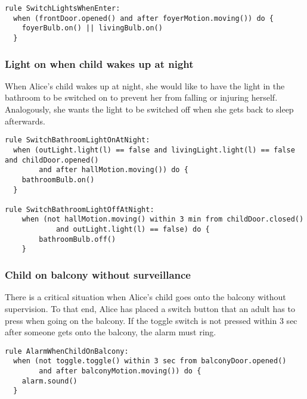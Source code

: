 \begin{lstlisting}[language=iotdsl]
rule SwitchLightsWhenEnter:
  when (frontDoor.opened() and after foyerMotion.moving()) do {
    foyerBulb.on() || livingBulb.on()
  }
\end{lstlisting}


\subsubsection*{Light on when child wakes up at night}
	
When Alice's child wakes up at night, she would like to have the light in the bathroom to be switched on to prevent her from falling or injuring herself. Analogously, she wants the light to be switched off when she gets back to sleep afterwards.
	
\begin{lstlisting}[language=iotdsl]
rule SwitchBathroomLightOnAtNight:	
  when (outLight.light(l) == false and livingLight.light(l) == false and childDoor.opened() 
  		and after hallMotion.moving()) do {
  	bathroomBulb.on()
  }
  
rule SwitchBathroomLightOffAtNight:	
	when (not hallMotion.moving() within 3 min from childDoor.closed() 
			and outLight.light(l) == false) do {
		bathroomBulb.off()
	}
\end{lstlisting}
	
\subsubsection*{Child on balcony without surveillance}
	
There is a critical situation when Alice's child goes onto the balcony without supervision. To that end, Alice has placed a switch button that an adult has to press when going on the balcony. If the toggle switch is not pressed within 3 sec after someone gets onto the balcony, the alarm must ring.

\begin{lstlisting}[language=iotdsl]
rule AlarmWhenChildOnBalcony:	
  when (not toggle.toggle() within 3 sec from balconyDoor.opened() 
  		and after balconyMotion.moving()) do {
    alarm.sound()
  }
\end{lstlisting}




